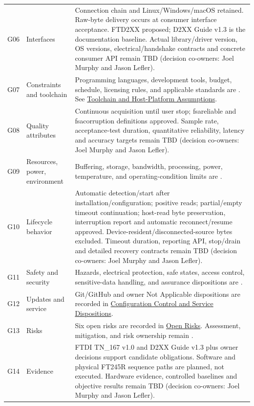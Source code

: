 \begin{tabularx}{\linewidth}{L{1.1cm}L{3.0cm}Y}
\label{Gap:G06}G06 & Interfaces & Connection chain and Linux/Windows/macOS retained. Raw-byte delivery occurs at consumer interface acceptance. FTD2XX proposed; D2XX Guide v1.3 is the documentation baseline. Actual library/driver version, OS versions, electrical/handshake contracts and concrete consumer API remain TBD (decision co-owners: Joel Murphy and Jason Lefler).\\
\label{Gap:G07}G07 & Constraints and toolchain & Programming languages, development tools, budget, schedule, licensing rules, and applicable standards are \OwnedTBD{}. See \hyperref[Section:ToolchainHostAssumptions]{Toolchain and Host-Platform Assumptions}.\\
\label{Gap:G08}G08 & Quality attributes & Continuous acquisition until user stop; \gls{fsareliable} and \gls{fsacorruption} definitions approved. Sample rate, acceptance-test duration, quantitative reliability, latency and accuracy targets remain TBD (decision co-owners: Joel Murphy and Jason Lefler).\\
\label{Gap:G09}G09 & Resources, power, environment & Buffering, storage, bandwidth, processing, power, temperature, and operating-condition limits are \OwnedTBD{}.\\
\label{Gap:G10}G10 & Lifecycle behavior & Automatic detection/start after installation/configuration; positive reads; partial/empty timeout continuation; host-read byte preservation, interruption report and automatic reconnect/resume approved. Device-resident/disconnected-source bytes excluded. Timeout duration, reporting API, stop/drain and detailed recovery contracts remain TBD (decision co-owners: Joel Murphy and Jason Lefler).\\
\label{Gap:G11}G11 & Safety and security & Hazards, electrical protection, safe states, access control, sensitive-data handling, and assurance dispositions are \OwnedTBD{}.\\
\label{Gap:G12}G12 & Updates and service & Git/GitHub and owner Not Applicable dispositions are recorded in \hyperref[Section:ProjectConfigurationControl]{Configuration Control and Service Dispositions}.\\
\label{Gap:G13}G13 & Risks & Six open risks are recorded in \hyperref[Table:ProjectOpenRisks]{Open Risks}. Assessment, mitigation, and risk ownership remain \OwnedTBD{}.\\
\label{Gap:G14}G14 & Evidence & FTDI TN\_167 v1.0 and D2XX Guide v1.3 plus owner decisions support candidate obligations. Software and physical FT245R sequence paths are planned, not executed. Hardware evidence, controlled baselines and objective results remain TBD (decision co-owners: Joel Murphy and Jason Lefler).\\

\end{tabularx}
